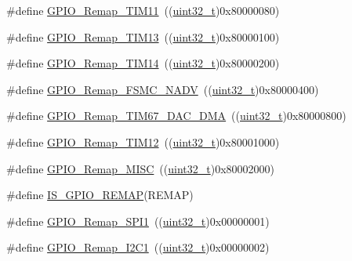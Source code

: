 \begin{DoxyCompactItemize}
\item 
\#define \hyperlink{group___g_p_i_o___remap__define_ga0f308f1bb45e4c473766603b4bef47f8}{G\+P\+I\+O\+\_\+\+Remap\+\_\+\+T\+I\+M11}~((\hyperlink{_p_e___types_8h_a33594304e786b158f3fb30289278f5af}{uint32\+\_\+t})0x80000080)
\item 
\#define \hyperlink{group___g_p_i_o___remap__define_ga72f5da86ed94f3be978cd841f7cd37cb}{G\+P\+I\+O\+\_\+\+Remap\+\_\+\+T\+I\+M13}~((\hyperlink{_p_e___types_8h_a33594304e786b158f3fb30289278f5af}{uint32\+\_\+t})0x80000100)
\item 
\#define \hyperlink{group___g_p_i_o___remap__define_gaa2ae554ed69ad3368c2cd7db678b3fd0}{G\+P\+I\+O\+\_\+\+Remap\+\_\+\+T\+I\+M14}~((\hyperlink{_p_e___types_8h_a33594304e786b158f3fb30289278f5af}{uint32\+\_\+t})0x80000200)
\item 
\#define \hyperlink{group___g_p_i_o___remap__define_ga97088efda8b8a057f4ba58de8f51625f}{G\+P\+I\+O\+\_\+\+Remap\+\_\+\+F\+S\+M\+C\+\_\+\+N\+A\+DV}~((\hyperlink{_p_e___types_8h_a33594304e786b158f3fb30289278f5af}{uint32\+\_\+t})0x80000400)
\item 
\#define \hyperlink{group___g_p_i_o___remap__define_gae69d46a269c2284c8cc6a90742e89b12}{G\+P\+I\+O\+\_\+\+Remap\+\_\+\+T\+I\+M67\+\_\+\+D\+A\+C\+\_\+\+D\+MA}~((\hyperlink{_p_e___types_8h_a33594304e786b158f3fb30289278f5af}{uint32\+\_\+t})0x80000800)
\item 
\#define \hyperlink{group___g_p_i_o___remap__define_ga44d3d86a684f62f9142d34ea5975a637}{G\+P\+I\+O\+\_\+\+Remap\+\_\+\+T\+I\+M12}~((\hyperlink{_p_e___types_8h_a33594304e786b158f3fb30289278f5af}{uint32\+\_\+t})0x80001000)
\item 
\#define \hyperlink{group___g_p_i_o___remap__define_ga543f3626303b3452528cb622ad088d26}{G\+P\+I\+O\+\_\+\+Remap\+\_\+\+M\+I\+SC}~((\hyperlink{_p_e___types_8h_a33594304e786b158f3fb30289278f5af}{uint32\+\_\+t})0x80002000)
\item 
\#define \hyperlink{group___g_p_i_o___remap__define_gaccf4664689f281fd4ee91ef16c9dc985}{I\+S\+\_\+\+G\+P\+I\+O\+\_\+\+R\+E\+M\+AP}(R\+E\+M\+AP)
\item 
\#define \hyperlink{group___g_p_i_o___remap__define_ga58b02a04a6041954c6e99e681716ab4c}{G\+P\+I\+O\+\_\+\+Remap\+\_\+\+S\+P\+I1}~((\hyperlink{_p_e___types_8h_a33594304e786b158f3fb30289278f5af}{uint32\+\_\+t})0x00000001)
\item 
\#define \hyperlink{group___g_p_i_o___remap__define_ga6cf601e6db62cb2e9dbbccb276401b18}{G\+P\+I\+O\+\_\+\+Remap\+\_\+\+I2\+C1}~((\hyperlink{_p_e___types_8h_a33594304e786b158f3fb30289278f5af}{uint32\+\_\+t})0x00000002)

\end{DoxyCompactItemize}
